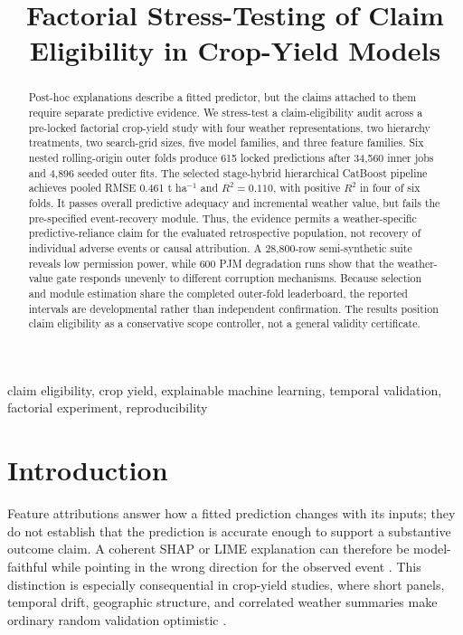 \documentclass[conference]{IEEEtran}
\title{Factorial Stress-Testing of Claim Eligibility in Crop-Yield Models}
\author{\IEEEauthorblockN{Anonymous authors}}
\begin{document}
\maketitle

\begin{abstract}
Post-hoc explanations describe a fitted predictor, but the claims attached to
them require separate predictive evidence. We stress-test a claim-eligibility
audit across a pre-locked factorial crop-yield study with four weather
representations, two hierarchy treatments, two search-grid sizes, five model
families, and three feature families. Six nested rolling-origin outer folds
produce 615 locked predictions after 34,560 inner jobs and 4,896 seeded outer
fits. The selected stage-hybrid hierarchical CatBoost pipeline achieves pooled
RMSE 0.461 t ha$^{-1}$ and $R^2=0.110$, with positive $R^2$ in four of six
folds. It passes overall predictive adequacy and incremental weather value, but
fails the pre-specified event-recovery module. Thus, the evidence permits a
weather-specific predictive-reliance claim for the evaluated retrospective
population, not recovery of individual adverse events or causal attribution. A
28,800-row semi-synthetic
suite reveals low permission power, while 600 PJM degradation runs show that
the weather-value gate responds unevenly to different corruption mechanisms.
Because selection and module estimation share the completed outer-fold
leaderboard, the reported intervals are developmental rather than independent
confirmation. The results position claim eligibility as a conservative scope
controller, not a general validity certificate.
\end{abstract}

\begin{IEEEkeywords}
claim eligibility, crop yield, explainable machine learning, temporal
validation, factorial experiment, reproducibility
\end{IEEEkeywords}

\section{Introduction}
Feature attributions answer how a fitted prediction changes with its inputs;
they do not establish that the prediction is accurate enough to support a
substantive outcome claim. A coherent SHAP or LIME explanation can therefore
be model-faithful while pointing in the wrong direction for the observed event
\cite{LundbergLee2017,Ribeiro2016}. This distinction is especially consequential
in crop-yield studies, where short panels, temporal drift, geographic structure,
and correlated weather summaries make ordinary random validation optimistic
\cite{Meroni2021,Roberts2017}.
\end{document}
